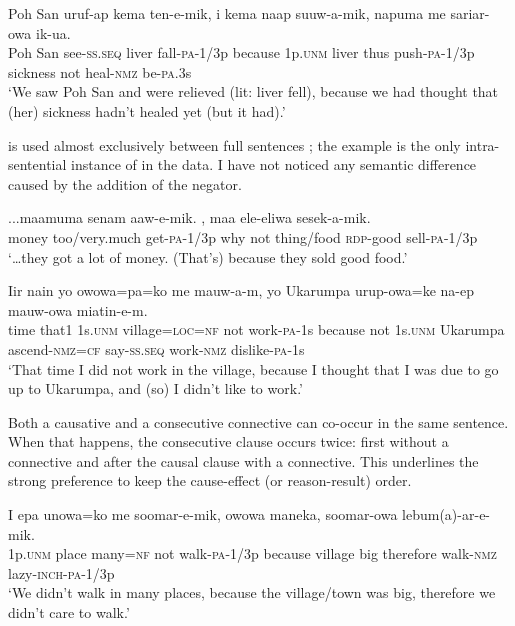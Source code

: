 \ea%
\label{ex:8:x1420}
\gll Poh  San  uruf-ap  kema  ten-e-mik,    i  kema naap  suuw-a-mik,  napuma  me  sariar-owa  ik-ua.\\
Poh  San  see-\textsc{ss}.\textsc{seq} liver fall-\textsc{pa}-1/3p  because 1p.\textsc{unm} liver thus  push-\textsc{pa}-1/3p sickness  not heal-\textsc{nmz} be-\textsc{pa}.3s\\
\glt`We saw Poh San and were relieved (lit: liver fell), because we had thought that (her) sickness hadn't healed yet (but it had).'
\z


 is used almost exclusively between full sentences ; the example  is the only intra-sentential instance of  in the data. I have not noticed any semantic difference caused by the addition of the negator.

\ea%
\label{ex:8:x1906}
\gll ...maamuma  senam  aaw-e-mik.    , maa  ele-eliwa  sesek-a-mik.\\
money  too/very.much  get-\textsc{pa}-1/3p why not thing/food  \textsc{rdp}-good sell-\textsc{pa}-1/3p\\
\glt`{\dots}they got a lot of money. (That's) because they sold good food.'
\z

 
\ea%
\label{ex:8:x1421}
\gll Iir  nain  yo  owowa=pa=ko  me  mauw-a-m,     yo  Ukarumpa  urup-owa=ke  na-ep mauw-owa  miatin-e-m.\\
time  that1  1s.\textsc{unm} village=\textsc{loc}=\textsc{nf} not  work-\textsc{pa}-1s because  not  1s.\textsc{unm} Ukarumpa  ascend-\textsc{nmz}=\textsc{cf} say-\textsc{ss}.\textsc{seq} work-\textsc{nmz} dislike-\textsc{pa}-1s\\
\glt`That time I did not work in the village, because I thought that I was due to go up to Ukarumpa, and (so) I didn't like to work.'
\z


Both a causative and a consecutive connective can co-occur in the same sentence. When that happens, the consecutive clause occurs twice: first without a connective and after the causal clause with a connective. This underlines the strong preference to keep the cause-effect (or reason-result) order.

\ea%
\label{ex:8:x1422}
\gll I  epa  unowa=ko  me  soomar-e-mik,    owowa maneka,    soomar-owa  lebum(a)-ar-e-mik.\\
1p.\textsc{unm} place  many=\textsc{nf} not  walk-\textsc{pa}-1/3p  because  village big  therefore  walk-\textsc{nmz} lazy-\textsc{inch}-\textsc{pa}-1/3p\\
\glt`We didn't walk in many places, because the village/town was big, therefore we didn't care to walk.'
\z


